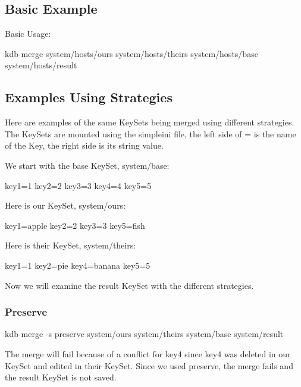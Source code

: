 \subsection*{Basic Example}

Basic Usage\+:


\begin{DoxyCode}
kdb merge system/hosts/ours system/hosts/theirs system/hosts/base system/hosts/result
\end{DoxyCode}


\subsection*{Examples Using Strategies}

Here are examples of the same Key\+Sets being merged using different strategies. The Key\+Sets are mounted using the {\ttfamily simpleini} file, the left side of \textquotesingle{}=\textquotesingle{} is the name of the Key, the right side is its string value.

We start with the base Key\+Set, {\ttfamily system/base}\+: \begin{DoxyVerb}    key1=1
    key2=2
    key3=3
    key4=4
    key5=5
\end{DoxyVerb}


Here is our Key\+Set, {\ttfamily system/ours}\+: \begin{DoxyVerb}    key1=apple
    key2=2
    key3=3
    key5=fish
\end{DoxyVerb}


Here is their Key\+Set, {\ttfamily system/theirs}\+: \begin{DoxyVerb}    key1=1
    key2=pie
    key4=banana
    key5=5
\end{DoxyVerb}


Now we will examine the result Key\+Set with the different strategies.

\subsubsection*{Preserve}


\begin{DoxyCode}
kdb merge -s preserve system/ours system/theirs system/base system/result
\end{DoxyCode}


The merge will fail because of a conflict for {\ttfamily key4} since {\ttfamily key4} was deleted in our Key\+Set and edited in their Key\+Set. Since we used preserve, the merge fails and the result Key\+Set is not saved.

